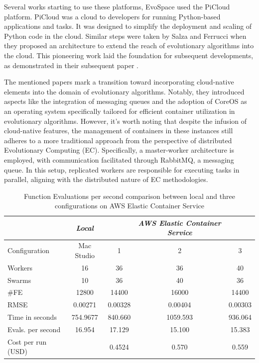 \documentclass{cys}
\begin{document}
Several works starting to use these platforms, EvoSpace \cite{garcia2015evospace} used the 
PiCloud platform. PiCloud was a cloud to developers for running Python-based applications and tasks.
It was designed to simplify the deployment and scaling of Python code in the cloud. 
Similar steps were taken by Salza and Ferrucci \cite{salza2016approach,salza2016develop}
when they proposed an architecture to extend the reach of evolutionary algorithms into the cloud.
This pioneering work laid the foundation for subsequent developments, 
as demonstrated in their subsequent paper \cite{de2017parallel}.

The mentioned papers mark a transition toward incorporating cloud-native elements 
into the domain of evolutionary algorithms. Notably, they introduced aspects like 
the integration of messaging queues and the adoption of CoreOS as an operating 
system specifically tailored for efficient container utilization in evolutionary algorithms.
However, it's worth noting that despite the infusion of cloud-native features, 
the management of containers in these instances still adheres to a more traditional 
approach from the perspective of distributed Evolutionary Computing (EC). Specifically, a 
master-worker architecture is employed, with communication facilitated through RabbitMQ, a messaging queue. 
In this setup, replicated workers are responsible for executing tasks in parallel, aligning 
with the distributed nature of EC methodologies.

\begin{table}[ht]
\small
\renewcommand{\arraystretch}{1.3}
	\centering
	\caption{Function Evaluations per second comparison between local and three configurations on AWS Elastic Container Service}
	\begin{tabular}{l|c|ccc}
	\hline
	 & \emph{Local}	&  & \emph{AWS Elastic Container Service} \\
    \hline
    Configuration &  Mac Studio   &   1    &    2    &   3 \\
	Workers & 16 	& 36     & 36     & 40  \\
    Swarms & 10 & 36  & 40    & 36  \\
    \#FE & 12800 & 14400 & 16000   & 14400 \\
	\hline	
	RMSE	& 0.00271       & 0.00328 & 0.00404 & 0.00303 \\
    Time in seconds	 &	754.9677 & 840.660 & 1059.593 & 936.064  \\
    Evals. per second	 &	16.954 & 17.129 & 15.100 & 15.383  \\
    Cost per run (USD)	 &         & 0.4524 & 0.570 & 0.559  \\
    
	\hline
	\end{tabular}
	\label{tab:aws-results}
\end{table}
\end{document}
